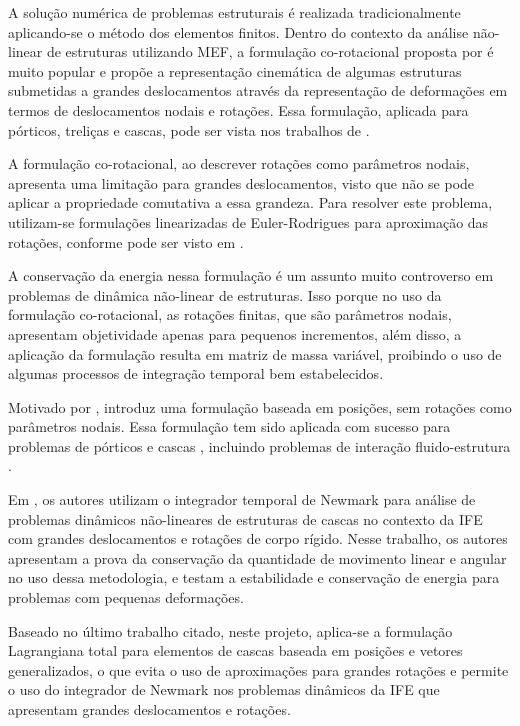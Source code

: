 \documentclass[tese_patricia.tex]{subfiles}
\begin{document}
A solução numérica de problemas estruturais é realizada tradicionalmente aplicando-se o método dos elementos finitos. Dentro do contexto da análise não-linear de estruturas utilizando MEF, a formulação co-rotacional proposta por  é muito popular e propõe a representação cinemática de algumas estruturas submetidas a grandes deslocamentos através da representação de deformações em termos de deslocamentos nodais e rotações. Essa formulação, aplicada para pórticos, treliças e cascas, pode ser vista nos trabalhos de .

A formulação co-rotacional, ao descrever rotações como parâmetros nodais, apresenta uma limitação para grandes deslocamentos, visto que não se pode aplicar a propriedade comutativa a essa grandeza. Para resolver este problema, utilizam-se formulações linearizadas de Euler-Rodrigues para aproximação das rotações, conforme pode ser visto em .

A conservação da energia nessa formulação é um assunto muito controverso em problemas de dinâmica não-linear de estruturas. Isso porque no uso da formulação co-rotacional, as rotações finitas, que são parâmetros nodais, apresentam objetividade apenas para pequenos incrementos, além disso, a aplicação da formulação resulta em matriz de massa variável, proibindo o uso de algumas processos de integração temporal bem estabelecidos. 

Motivado por ,  introduz uma formulação baseada em posições, sem rotações como parâmetros nodais. Essa formulação tem sido aplicada com sucesso para problemas de pórticos e cascas \cite{CodaG:2004,CodaP:2010,CarrazedoC:2010,CodaP:2011}, incluindo problemas de interação fluido-estrutura \cite{SanchesC:2013,SanchesC:2014,FernandesCS:2019}.

Em , os autores utilizam o integrador temporal de Newmark para análise de problemas dinâmicos não-lineares de estruturas de cascas no contexto da IFE com grandes deslocamentos e rotações de corpo rígido. Nesse trabalho, os autores apresentam a prova da conservação da quantidade de movimento linear e angular no uso dessa metodologia, e testam a estabilidade e conservação de energia para problemas com pequenas deformações. 

Baseado no último trabalho citado, neste projeto, aplica-se a formulação Lagrangiana total para elementos de cascas baseada em posições e vetores generalizados, o que evita o uso de aproximações para grandes rotações e permite o uso do integrador de Newmark nos problemas dinâmicos da IFE que apresentam grandes deslocamentos e rotações.
\end{document}
